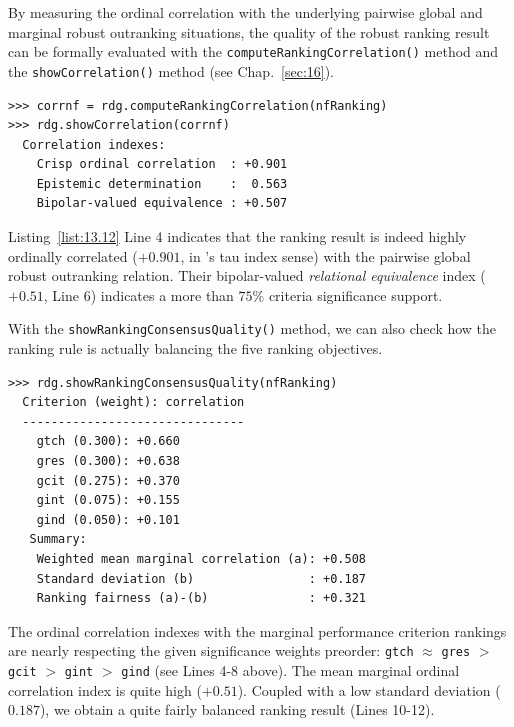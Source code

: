 By measuring the ordinal correlation with the underlying pairwise global and marginal robust outranking situations, the quality of the robust \NetFlows ranking result can be formally evaluated with the \texttt{computeRankingCorrelation()} method and the \texttt{showCorrelation()} method (see Chap.~\ref{sec:16}).
\begin{lstlisting}[caption={Measuring the quality of the \NetFlows ranking result},label=list:13.12]
>>> corrnf = rdg.computeRankingCorrelation(nfRanking)
>>> rdg.showCorrelation(corrnf)   
  Correlation indexes:
    Crisp ordinal correlation  : +0.901
    Epistemic determination    :  0.563
    Bipolar-valued equivalence : +0.507
\end{lstlisting}

Listing~\vref{list:13.12} Line 4 indicates that the \NetFlows ranking result is indeed highly ordinally correlated ($+0.901$, in \Kendall 's tau index sense) with the pairwise global robust outranking relation. Their bipolar-valued \emph{relational equivalence} index ($+0.51$, Line 6) indicates a more than $75\%$ criteria significance support.

With the \texttt{showRankingConsensusQuality()} method,  we can also check how the \NetFlows ranking rule is actually balancing the five ranking objectives.
\begin{lstlisting}[caption={Measuring the consensus quality of the \NetFlows ranking result},label=list:13.13]
>>> rdg.showRankingConsensusQuality(nfRanking)
  Criterion (weight): correlation
  -------------------------------
    gtch (0.300): +0.660
    gres (0.300): +0.638
    gcit (0.275): +0.370
    gint (0.075): +0.155
    gind (0.050): +0.101
   Summary:
    Weighted mean marginal correlation (a): +0.508
    Standard deviation (b)                : +0.187
    Ranking fairness (a)-(b)              : +0.321
\end{lstlisting}

The ordinal correlation indexes with the marginal performance criterion rankings are nearly respecting the given significance weights preorder: \texttt{gtch} $\approx$ \texttt{gres} $>$ \texttt{gcit} $>$ \texttt{gint} $>$ \texttt{gind} (see Lines 4-8 above). The mean marginal ordinal correlation index is quite high ($+0.51$). Coupled with a low standard deviation ($0.187$), we obtain a quite fairly balanced ranking result (Lines 10-12). 

